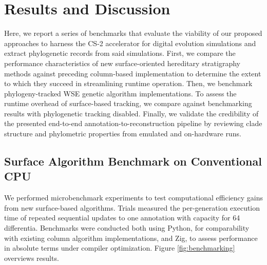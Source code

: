 \section{Results and Discussion} \label{sec:results}

Here, we report a series of benchmarks that evaluate the viability of our proposed approaches to harness the CS-2 accelerator for digital evolution simulations and extract phylogenetic records from said simulations.
First, we compare the performance characteristics of new surface-oriented hereditary stratigraphy methods against preceding column-based implementation to determine the extent to which they succeed in streamlining runtime operation.
Then, we benchmark phylogeny-tracked WSE genetic algorithm implementations.
To assess the runtime overhead of surface-based tracking, we compare against benchmarking results with phylogenetic tracking disabled.
Finally, we validate the credibility of the presented end-to-end annotation-to-reconstruction pipeline by reviewing clade structure and phylometric properties from emulated and on-hardware runs.

\subsection{Surface Algorithm Benchmark on Conventional CPU}



We performed microbenchmark experiments to test computational efficiency gains from new surface-based algorithms.
Trials measured the per-generation execution time of repeated sequential updates to one annotation with capacity for 64 differentia. %
Benchmarks were conducted both using Python, for comparability with existing column algorithm implementations, and Zig, to assess performance in absolute terms under compiler optimization.
Figure \ref{fig:benchmarking} overviews results.


